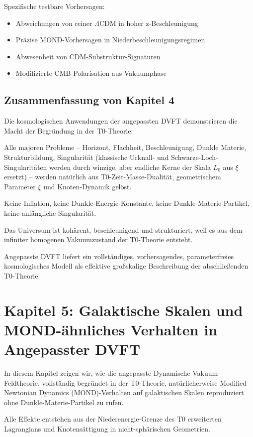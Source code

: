\documentclass[12pt,a4paper]{article}
\begin{document}
	Spezifische testbare Vorhersagen:
	\begin{itemize}
		\item Abweichungen von reiner $\Lambda$CDM in hoher z-Beschleunigung
		\item Präzise MOND-Vorhersagen in Niederbeschleunigungsregimen
		\item Abwesenheit von CDM-Substruktur-Signaturen
		\item Modifizierte CMB-Polarisation aus Vakuumphase
	\end{itemize}
	
	\subsection{Zusammenfassung von Kapitel 4}
	
	Die kosmologischen Anwendungen der angepassten DVFT demonstrieren die Macht der Begründung in der T0-Theorie:
	
	Alle majoren Probleme – Horizont, Flachheit, Beschleunigung, Dunkle Materie, Strukturbildung, Singularität (klassische Urknall- und Schwarze-Loch-Singularitäten werden durch winzige, aber endliche Kerne der Skala $L_0$ aus $\xi$ ersetzt) – werden natürlich aus T0-Zeit-Masse-Dualität, geometrischem Parameter $\xi$ und Knoten-Dynamik gelöst.
	
	Keine Inflation, keine Dunkle-Energie-Konstante, keine Dunkle-Materie-Partikel, keine anfängliche Singularität.
	
	Das Universum ist kohärent, beschleunigend und strukturiert, weil es aus dem infiniter homogenen Vakuumzustand der T0-Theorie entsteht.
	
	Angepasste DVFT liefert ein vollständiges, vorhersagendes, parameterfreies kosmologisches Modell als effektive großskalige Beschreibung der abschließenden T0-Theorie.
	
	\section{Kapitel 5: Galaktische Skalen und MOND-ähnliches Verhalten in Angepasster DVFT}
	
	In diesem Kapitel zeigen wir, wie die angepasste Dynamische Vakuum-Feldtheorie, vollständig begründet in der T0-Theorie, natürlicherweise Modified Newtonian Dynamics (MOND)-Verhalten auf galaktischen Skalen reproduziert ohne Dunkle-Materie-Partikel zu rufen.
	
	Alle Effekte entstehen aus der Niederenergie-Grenze des T0 erweiterten Lagrangians und Knotensättigung in nicht-sphärischen Geometrien.
	
\end{document}
